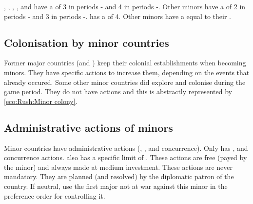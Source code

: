 

 \paysPortugal, \paysVenise, \paysGenes,
\paysSuede, \paysDanemark and \paysHollande have a \FTI of 3 in periods
- and 4 in periods -.
\bparag Other minors have a \FTI of 2 in periods - and 3
in periods -.
\bparag \paysHollande has a \DTI of 4.
Other minors have a \DTI equal to their \FTI.



\subsection{Colonisation by minor countries}

\aparag Former major countries (\paysPortugal and \paysVenise) keep their
colonial establishments when becoming minors. They have specific actions to
increase them, depending on the events that already occured.
\bparag Some other minor countries did explore and colonise during the game
period. They do not have actions and this is abstractly represented by
\ref{eco:Rush:Minor colony}.



\subsection{Administrative actions of minors}

\aparag Minor countries have administrative actions (\TFI, \COL, \TP and
concurrence).
\bparag Only \paysPortugal has \COL, \TP and concurrence actions. \paysVenise
also has a specific limit of \TFI.
\bparag These actions are free (payed by the minor) and always made at medium
investment.
\bparag These actions are never mandatory.
\bparag They are planned (and resolved) by the diplomatic patron of the
country. If neutral, use the first major not at war against this minor in the
preference order for controlling it.

